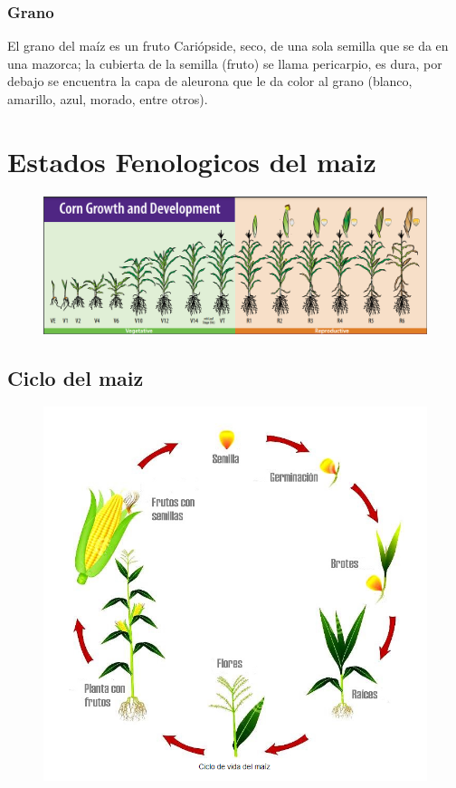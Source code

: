 \documentclass[utf8]{FrontiersinHarvard} %
\begin{document}
    
    \subsubsection{Grano} 
    El grano del maíz es un fruto Cariópside, seco, de una sola 
    semilla que se da en una mazorca; la cubierta de la semilla (fruto) 
    se llama pericarpio, es dura, por debajo se encuentra la capa de aleurona 
    que le da color al grano 
    (blanco, amarillo, azul, morado, entre otros). 


\section{Estados Fenologicos del maiz }
\begin{figure}[h]
    \centering
    \includegraphics[scale=.7]{./images/fenologia.png}
\end{figure}
\subsection{Ciclo del maiz}
\begin{figure}[h]
    \centering
    \includegraphics[scale=.8]{./images/ciclomaiz.png}
\end{figure}
\end{document}
